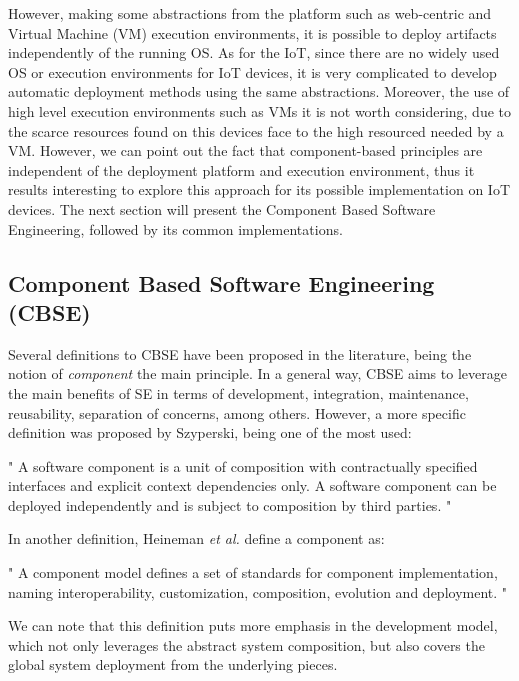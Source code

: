 However, making some abstractions from the platform such as web-centric and Virtual Machine (VM) execution environments, it is possible to deploy artifacts independently of the running OS.
As for the IoT, since there are no widely used OS or execution environments for IoT devices, it is very complicated to develop automatic deployment methods using the same abstractions.
Moreover, the use of high level execution environments such as VMs it is not worth considering, due to the scarce resources found on this devices face to the high resourced needed by a VM.
However, we can point out the fact that component-based principles are independent of the deployment platform and execution environment, thus it results interesting to explore this approach for its possible implementation on IoT devices.
The next section will present the Component Based Software Engineering, followed by its common implementations.


\subsection{Component Based Software Engineering (CBSE)}
\label{sec:CBSE}
Several definitions to CBSE have been proposed in the literature, being the notion of \textit{component} the main principle.
In a general way, CBSE aims to leverage the main benefits of SE in terms of development, integration, maintenance, reusability, separation of concerns, among others.
However, a more specific definition was proposed by Szyperski\cite{szyperski2002component}, being one of the most used:
\begin{citeverbatim}
	" A software component is a unit of composition with contractually specified interfaces and explicit context dependencies only. A software component can be deployed independently and is subject to composition by third parties. "
\end{citeverbatim}
In another definition, Heineman \textit{et al.}\cite{heineman2001cbse} define a component as:
\begin{citeverbatim}
	" A component model defines a set of standards for component implementation, naming interoperability, customization, composition, evolution and deployment. "
\end{citeverbatim}
We can note that this definition puts more emphasis in the development model, which not only leverages the abstract system composition, but also covers the global system deployment from the underlying pieces.

